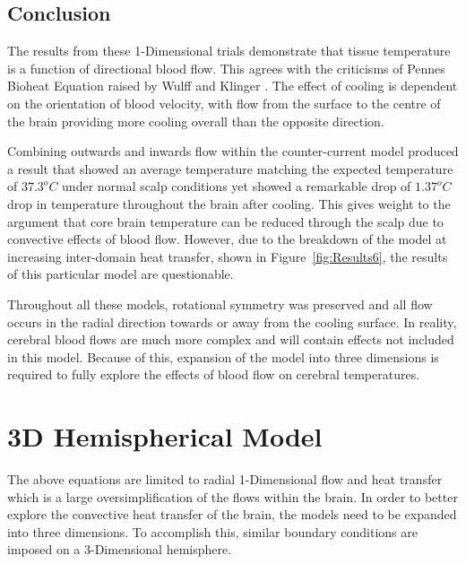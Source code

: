 \documentclass[11pt,english,a4paper,twoside,openright]{report}
\begin{document}
{{{{{{{{\subsection{Conclusion}

The results from these 1-Dimensional trials demonstrate that tissue temperature is a function of directional blood flow. This agrees with the criticisms of Pennes Bioheat Equation raised by Wulff \cite{wulff1974energy} and Klinger \cite{klinger1978heat}. The effect of cooling is dependent on the orientation of blood velocity, with flow from the surface to the centre of the brain providing more cooling overall than the opposite direction. 

Combining outwards and inwards flow within the counter-current model produced a result that showed an average temperature matching the expected temperature of $37.3^{o}C$ under normal scalp conditions yet showed a remarkable drop of $1.37^{o}C$ drop in temperature throughout the brain after cooling. This gives weight to the argument that core brain temperature can be reduced through the scalp due to convective effects of blood flow. However, due to the breakdown of the model at increasing inter-domain heat transfer, shown in Figure~\ref{fig:Results6}, the results of this particular model are questionable. 

Throughout all these models, rotational symmetry was preserved and all flow occurs in the radial direction towards or away from the cooling surface. In reality, cerebral blood flows are much more complex and will contain effects not included in this model. Because of this, expansion of the model into three dimensions is required to fully explore the effects of blood flow on cerebral temperatures.

\section[3D Hemispherical Model]{{\Large 3D H}emispherical {\Large M}odel}

The above equations are limited to radial 1-Dimensional flow and heat transfer which is a large oversimplification of the flows within the brain. In order to better explore the convective heat transfer of the brain, the models need to be expanded into three dimensions. To accomplish this, similar boundary conditions are imposed on a 3-Dimensional hemisphere.

}}}}}}}}
\end{document}
